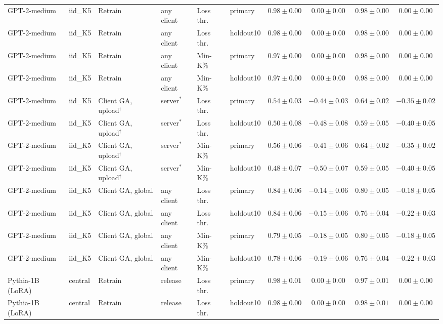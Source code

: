 {\begin{longtable}{@{\extracolsep{\fill}}llllllcccc@{}}
GPT-2-medium & iid\_K5 & Retrain & any client & Loss thr. & primary & $0.98 \pm 0.00$ & $0.00 \pm 0.00$ & $0.98 \pm 0.00$ & $0.00 \pm 0.00$ \\
GPT-2-medium & iid\_K5 & Retrain & any client & Loss thr. & holdout10 & $0.98 \pm 0.00$ & $0.00 \pm 0.00$ & $0.98 \pm 0.00$ & $0.00 \pm 0.00$ \\
GPT-2-medium & iid\_K5 & Retrain & any client & Min-K\% & primary & $0.97 \pm 0.00$ & $0.00 \pm 0.00$ & $0.98 \pm 0.00$ & $0.00 \pm 0.00$ \\
GPT-2-medium & iid\_K5 & Retrain & any client & Min-K\% & holdout10 & $0.97 \pm 0.00$ & $0.00 \pm 0.00$ & $0.98 \pm 0.00$ & $0.00 \pm 0.00$ \\
GPT-2-medium & iid\_K5 & Client GA, upload$^{\dagger}$ & server$^{*}$ & Loss thr. & primary & $0.54 \pm 0.03$ & $-0.44 \pm 0.03$ & $0.64 \pm 0.02$ & $-0.35 \pm 0.02$ \\
GPT-2-medium & iid\_K5 & Client GA, upload$^{\dagger}$ & server$^{*}$ & Loss thr. & holdout10 & $0.50 \pm 0.08$ & $-0.48 \pm 0.08$ & $0.59 \pm 0.05$ & $-0.40 \pm 0.05$ \\
GPT-2-medium & iid\_K5 & Client GA, upload$^{\dagger}$ & server$^{*}$ & Min-K\% & primary & $0.56 \pm 0.06$ & $-0.41 \pm 0.06$ & $0.64 \pm 0.02$ & $-0.35 \pm 0.02$ \\
GPT-2-medium & iid\_K5 & Client GA, upload$^{\dagger}$ & server$^{*}$ & Min-K\% & holdout10 & $0.48 \pm 0.07$ & $-0.50 \pm 0.07$ & $0.59 \pm 0.05$ & $-0.40 \pm 0.05$ \\
GPT-2-medium & iid\_K5 & Client GA, global & any client & Loss thr. & primary & $0.84 \pm 0.06$ & $-0.14 \pm 0.06$ & $0.80 \pm 0.05$ & $-0.18 \pm 0.05$ \\
GPT-2-medium & iid\_K5 & Client GA, global & any client & Loss thr. & holdout10 & $0.84 \pm 0.06$ & $-0.15 \pm 0.06$ & $0.76 \pm 0.04$ & $-0.22 \pm 0.03$ \\
GPT-2-medium & iid\_K5 & Client GA, global & any client & Min-K\% & primary & $0.79 \pm 0.05$ & $-0.18 \pm 0.05$ & $0.80 \pm 0.05$ & $-0.18 \pm 0.05$ \\
GPT-2-medium & iid\_K5 & Client GA, global & any client & Min-K\% & holdout10 & $0.78 \pm 0.06$ & $-0.19 \pm 0.06$ & $0.76 \pm 0.04$ & $-0.22 \pm 0.03$ \\
Pythia-1B (LoRA) & central & Retrain & release & Loss thr. & primary & $0.98 \pm 0.01$ & $0.00 \pm 0.00$ & $0.97 \pm 0.01$ & $0.00 \pm 0.00$ \\
Pythia-1B (LoRA) & central & Retrain & release & Loss thr. & holdout10 & $0.98 \pm 0.00$ & $0.00 \pm 0.00$ & $0.98 \pm 0.01$ & $0.00 \pm 0.00$ \\

\end{longtable}}
